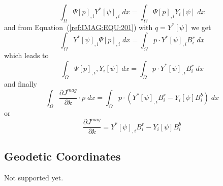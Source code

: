 \begin{equation}\label{ref:IMAG:EQU:202dd}
\int_{\Omega} \Psi[p]_{,i} Y^*[\psi]_{,i} \; dx  =  \int_{\Omega} \Psi[p]_{,i} Y_i[\psi]  \; dx
\end{equation} 
and from Equation~(\ref{ref:IMAG:EQU:201}) with $q=Y^*[\psi]$ we get
\begin{equation}\label{ref:IMAG:EQU:20e}
\int_{\Omega} Y^*[\psi]_{,i}  \Psi[p]_{,i} \; dx  = \int_{\Omega}  p \cdot Y^*[\psi]_{,i}  B^r_i \; dx  
\end{equation}
which leads to 
\begin{equation}\label{ref:IMAG:EQU:20ee}
\int_{\Omega} \Psi[p]_{,i} ,Y_i[\psi]  \; dx  = \int_{\Omega}  p \cdot Y^*[\psi]_{,i}  B^r_i \; dx  
\end{equation}
and finally
\begin{equation}\label{ref:IMAG:EQU:201a}
\int_{\Omega}   \frac{\partial J^{mag}}{\partial k} \cdot p \;  dx  = \int_{\Omega}  
p \cdot (Y^*[\psi]_{,i}  B^r_i - Y_i[\psi] B^b_i) \; dx  
\end{equation} 
or 
\begin{equation}\label{ref:IMAG:EQU:201b}
\frac{\partial J^{mag}}{\partial k} = Y^*[\psi]_{,i}  B^r_i - Y_i[\psi] B^b_i
\end{equation}

\subsection{Geodetic Coordinates}
Not supported yet.
